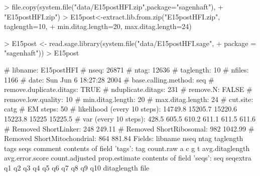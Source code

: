 \documentclass[12pt]{article}
\begin{document}
\begin{Schunk}
\begin{Sinput}
> file.copy(system.file("data/E15postHFI.zip",package="sagenhaft"),
+          "E15postHFI.zip")
> E15post<-extract.lib.from.zip("E15postHFI.zip", taglength=10,
+                               min.ditag.length=20, max.ditag.length=24)
\end{Sinput}
\end{Schunk}

\begin{Schunk}
\begin{Sinput}
> E15post <- read.sage.library(system.file("data/E15postHFI.sage", 
+     package = "sagenhaft"))
> E15post
\end{Sinput}
\begin{Soutput}
# libname: E15postHFI
# nseq: 26871
# ntag: 12636
# taglength: 10
# nfiles: 1166
# date: Sun Jun  6 18:27:28 2004
# base.calling.method: seq
# remove.duplicate.ditags: TRUE
# nduplicate.ditags: 231
# remove.N: FALSE
# remove.low.quality: 10
# min.ditag.length: 20
# max.ditag.length: 24
# cut.site: catg
# EM steps: 50
# likelihood (every 10 steps): 14749.8 15205.7 15220.6 15223.8 15225 15225.5
# var (every 10 steps): 428.5 605.5 610.2 611.1 611.5 611.6
# Removed ShortLinker: 248 249.11
# Removed ShortRibosomal: 982 1042.99
# Removed ShortMitochondrial: 864 881.84
Fields:
libname nseq ntag taglength tags seqs comment
contents of field 'tags':
tag count.raw a c g t avg.ditaglength avg.error.score count.adjusted prop.estimate
contents of field 'seqs':
seq seqextra q1 q2 q3 q4 q5 q6 q7 q8 q9 q10 ditaglength file


\end{Soutput}
\end{Schunk}
\end{document}
